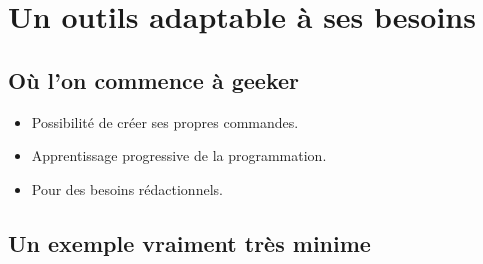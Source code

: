 \section{Un outils adaptable à ses besoins}

\subsection{Où l'on commence à geeker}

\begin{frame}
  \begin{itemize}
    \item Possibilité de créer ses propres commandes.
    \item Apprentissage progressive de la programmation.
    \item Pour des besoins rédactionnels.
  \end{itemize}
\end{frame}

\subsection{Un exemple vraiment très minime}
\begin{frame}
  \newcommand{\index}[2][]{}
  \beamerdefaultoverlayspecification{}
  \inputminted{latex}{examples/prog.tex}
  
\end{frame}
